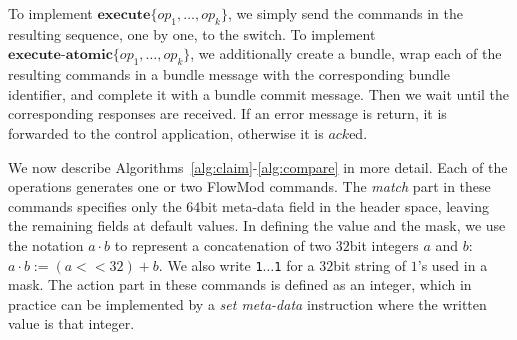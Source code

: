 \documentclass[conference]{sigcomm-alternate}
\newcommand{\hide}[1]{}
\newcommand{\concat}[0]{\cdot}
\newcommand{\add}{\textbf{add}\xspace}
\newcommand{\dele}{\textbf{delete}\xspace}
\newcommand{\checko}{\texttt{check\_overlap}\xspace}
\newcommand{\exec}{\textbf{execute}}
\newcommand{\execatomic}{\textbf{execute-atomic}}
\newcommand{\ack}{\textit{ack}}
\begin{document}
To implement  $\exec\{op_1,\ldots,op_k\}$, we simply send the commands in
the resulting sequence, one by one, to the switch.
%
To implement  $\execatomic\{op_1,\ldots,op_k\}$, we
additionally create a bundle, wrap each of the resulting commands in a
bundle message with the corresponding bundle identifier, and complete it
with a bundle commit message.
Then we wait until the
corresponding responses are received.
If an error message is return,
it is forwarded to the control application,
otherwise it is $\ack$ed.

We now describe Algorithms~\ref{alg:claim}-\ref{alg:compare} in more
detail.
Each of the operations generates one or two FlowMod commands.
The \textit{match} part in these commands specifies only the $64$bit meta-data
field in the header space, leaving the remaining fields at default
values.
In defining the value and the mask, 
we
use the notation $a\concat b$ to represent a concatenation of two
$32$bit integers $a$ and $b$: $a\concat b := (a<<32)+b$.
We also write \texttt{1$\ldots$1} for  a $32$bit
string of $1$'s used in a mask.
%
The action part in these commands is defined as an integer, which in
practice can be implemented by a \emph{set meta-data} instruction where the written value is that integer.


\hide{
To simplify the presentation we set the FlowMod command field values with integers, according to the following guidelines:
\begin{itemize}

\item {\bf  Flag:} we often use the $\checko$ optional flag value to make the command execution dependent on switch state. In other cases, when the flag value remains zero, we omit the assignment.

\item {\bf  Match:} we consider the match part of an entry to be a ternary string of bounded length, represented by binary strings (integers) named value and mask. In general, the match can be applied to any set of supported packet header fields. In our implementation, the $64$bit meta-data field alone is sufficient. We sometimes use the concatenation of two $32$bit integers, denoted by $a\concat b$, to form one match value or mask, where $a\concat b := (a<<32)+b$.

\item {\bf Action:} we consider the action part of an entry to be an integer, which in practice can be implemented by a \emph{set meta-data} instruction where the written value is that integer.

\end{itemize}

In addition we use "op" as shortened form to a field that indicates whether the command should $\add$ or $\dele$ the specified flow entry. This corresponds to the FlowMod field named "command" which can receive values \textt{ofpfc\_add} and \texttt{ofpfc\_delete}.
}
\end{document}

